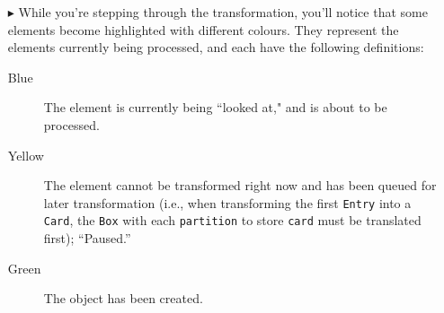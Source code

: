 \begin{itemize}
\item[$\blacktriangleright$] While you're stepping through the transformation, you'll notice that some elements become highlighted with different colours. They
represent the elements currently being processed, and each have the following definitions:

\begin{description}
  \item[Blue] The element is currently being ``looked at," and is about to be processed.
  
  \vspace{0.5cm}
  
  \item[Yellow] The element cannot be transformed right now and has been queued for later transformation (i.e., when transforming the first
  \texttt{Entry} into a \texttt{Card}, the \texttt{Box} with each \texttt{partition} to store \texttt{card} must be translated first); ``Paused.''
  
  \vspace{0.5cm}
  
  \item[Green] The object has been created.

\end{description}

\end{itemize}
